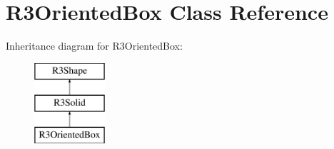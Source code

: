 \hypertarget{class_r3_oriented_box}{}\section{R3\+Oriented\+Box Class Reference}
\label{class_r3_oriented_box}
Inheritance diagram for R3\+Oriented\+Box\+:\begin{figure}[H]
\begin{center}
\leavevmode
\includegraphics[height=3.000000cm]{class_r3_oriented_box}
\end{center}
\end{figure}
